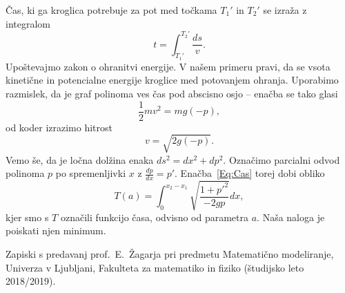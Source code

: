 \documentclass[a4paper]{article}
\begin{document}
Čas, ki ga kroglica potrebuje za pot med točkama $T_{1}'$ in $T_{2}'$ se izraža z integralom 
\begin{equation}
\label{Eq:Cas}
t = \int_{T_{1}'}^{T_{2}'} \frac{ds}{v}.
\end{equation}
%
Upoštevajmo zakon o ohranitvi energije. V našem primeru pravi, da se vsota kinetične in potencialne energije kroglice med potovanjem ohranja. Uporabimo razmislek, da je graf polinoma ves čas pod abscisno osjo -- enačba se tako glasi
\begin{equation*}
\frac{1}{2}mv^2 = mg(-p),
\end{equation*}
od koder izrazimo hitrost
\begin{equation*}
v = \sqrt{2g(-p)}.
\end{equation*}
%
Vemo še, da je ločna dolžina enaka $ds^2 = dx^2 + dp^2$. Označimo parcialni odvod polinoma $p$ po spremenljivki $x$ z $\frac{dp}{dx}=p'$. Enačba~\eqref{Eq:Cas} torej dobi obliko
\begin{equation}
T(a) = \int_{0}^{x_2-x_1} \sqrt{ \frac{1+p'^2}{-2gp}} dx,
\end{equation}
kjer smo s $T$ označili funkcijo časa, odvisno od parametra $a$. Naša naloga je poiskati njen minimum.


\begin{thebibliography}{99}

 Zapiski s predavanj prof.~E.~Žagarja pri predmetu Matematično modeliranje, Univerza v Ljubljani, Fakulteta za matematiko in fiziko (študijsko leto 2018/2019).

\end{thebibliography}
\end{document}
